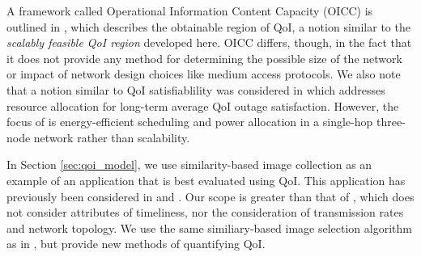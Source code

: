 
A framework called Operational Information Content Capacity (OICC) is outlined in \cite{oicc_journal}, which describes the obtainable region of QoI, a notion similar to the \emph{scalably feasible QoI region} developed here. OICC differs, though, in the fact that it does not provide any method for determining the possible size of the network or impact of network design choices like medium access protocols. We also note that a notion similar to QoI satisfiablility was considered in \cite{qoi_outage} which addresses resource allocation for long-term average QoI outage satisfaction. However, the focus of \cite{qoi_outage} is energy-efficient scheduling and power allocation in a single-hop three-node network rather than scalability. 

In Section \ref{sec:qoi_model}, we use similarity-based image collection as an example of an application that is best evaluated using QoI.  This application has previously been considered in \cite{photonet} and \cite{mediascope}. Our scope is greater than that of \cite{photonet}, which does not consider attributes of timeliness, nor the consideration of transmission rates and network topology.  We use the same similiary-based image selection algorithm as in \cite{mediascope}, but provide new methods of quantifying QoI.%
